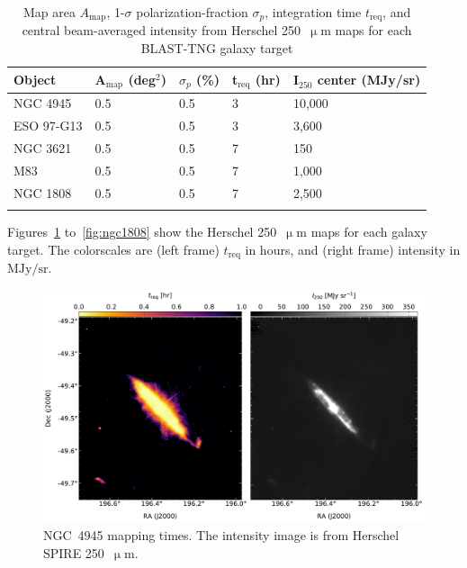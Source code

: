 \begin{table}[!htbp]
\centering
\begin{tabular}{@{}lllll@{}}
\dtoprule
Object & A$_{\mathrm{map}}$ (deg$^{2}$) & $\sigma_{p}$ (\%) & t$_{\mathrm{req}}$ (hr) & I$_{250}$ center (MJy/sr) \\ \midrule
NGC 4945 & 0.5 & 0.5 & 3 & 10,000 \\
ESO 97-G13 & 0.5 & 0.5 & 3 & 3,600 \\
NGC 3621 & 0.5 & 0.5 & 7 & 150 \\
M83 & 0.5 & 0.5 & 7 & 1,000 \\
NGC 1808 & 0.5 & 0.5 & 7 & 2,500 \\ \bottomrule
\\
\end{tabular}
\caption[~Key mapping parameters for the BLAST-TNG external galaxy targets.]{Map area $A_{\mathrm{map}}$, 1-$\sigma$ polarization-fraction $\sigma_{p}$, integration time $t_{\mathrm{req}}$, and central beam-averaged intensity from Herschel 250~$\upmu$m maps for each BLAST-TNG galaxy target}
\label{table:treq}
\end{table}

Figures~\ref{fig:ngc4945} to~\ref{fig:ngc1808} show the Herschel 250~$\upmu$m maps for each galaxy target. The colorscales are (left frame) $t_{\mathrm{req}}$ in hours, and (right frame) intensity in $\mathrm{MJy/sr}$.

\begin{figure}[!htbp]
\centering
\includegraphics[width=\textwidth]{figures/galaxies/ngc4945}
\caption[~NGC 4945.]{NGC~4945 mapping times. The intensity image is from Herschel SPIRE 250~$\upmu$m.}
\label{fig:ngc4945}
\end{figure}

